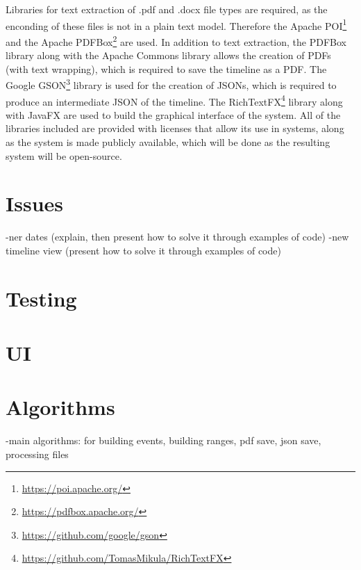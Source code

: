 \par Libraries for text extraction of .pdf and .docx file types are required, as the enconding of these files is not in a plain text model. Therefore the Apache POI\footnote{\url{https://poi.apache.org/}} and the Apache PDFBox\footnote{\url{https://pdfbox.apache.org/}} are used. In addition to text extraction, the PDFBox library along with the Apache Commons library allows the creation of PDFs (with text wrapping), which is required to save the timeline as a PDF. The Google GSON\footnote{\url{https://github.com/google/gson}} library is used for the creation of JSONs, which is required to produce an intermediate JSON of the timeline. The RichTextFX\footnote{\url{https://github.com/TomasMikula/RichTextFX}} library along with JavaFX are used to build the graphical interface of the system. All of the libraries included are provided with licenses that allow its use in systems, along as the system is made publicly available, which will be done as the resulting system will be open-source.

\section{Issues}
-ner dates (explain, then present how to solve it through examples of code)
-new timeline view (present how to solve it through examples of code)
\section{Testing}
\section{UI}
\section{Algorithms}
-main algorithms: for building events, building ranges, pdf save, json save, processing files
